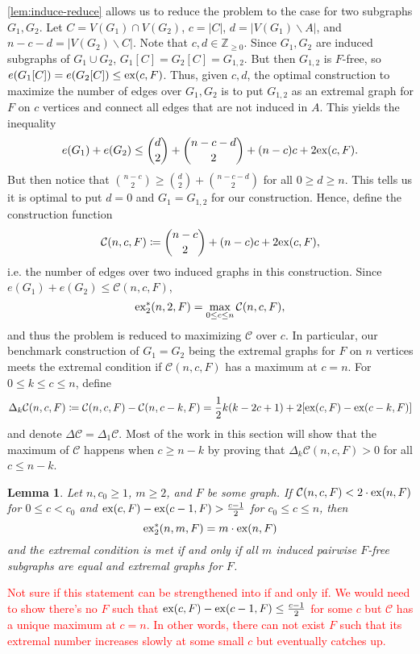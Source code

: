 \documentclass[12pt]{report}
\newtheorem{lemma}[theorem]{Lemma}
\newcommand*{\Z}{\mathbb{Z}}
\newcommand*{\ex}{\textnormal{ex}}
\newcommand*{\dex}{\textnormal{ex}_2}
\newcommand*{\con}{\mathcal{C}}
\begin{document}
\cref{lem:induce-reduce} allows us to reduce the problem to the case for two subgraphs $G_1, G_2$. Let $C = V(G_1) \cap V(G_2)$, $c = |C|$, $d = |V(G_1) \backslash A|$, and $n - c - d = |V(G_2) \backslash C|$. Note that $c, d \in \Z_{\geq 0}$. Since $G_1, G_2$ are induced subgraphs of $G_1 \cup G_2$, $G_1[C] = G_2[C] = G_{1, 2}$. But then $G_{1, 2}$ is $F$-free, so $e(G_1[C]) = e(G_2[C]) \leq \ex(c, F)$. Thus, given $c, d$, the optimal construction to maximize the number of edges over $G_1, G_2$ is to put $G_{1, 2}$ as an extremal graph for $F$ on $c$ vertices and connect all edges that are not induced in $A$. This yields the inequality
\[
  e(G_1) + e(G_2) \leq \binom{d}{2} + \binom{n - c - d}{2} + (n - c)c + 2\ex(c, F).
\]
But then notice that $\binom{n - c}{2} \geq \binom{d}{2} + \binom{n - c - d}{2}$ for all $0 \geq d \geq n$. This tells us it is optimal to put $d = 0$ and $G_1 = G_{1, 2}$ for our construction. Hence, define the construction function
\[
  \con(n, c, F) \coloneq \binom{n - c}{2} + (n - c)c + 2\ex(c, F),
\]
i.e. the number of edges over two induced graphs in this construction. Since $e(G_1) + e(G_2) \leq \con(n, c, F)$, 
\[
  \dex^*(n, 2, F) = \max_{0 \leq c \leq n} \con(n, c, F),
\]
and thus the problem is reduced to maximizing $\con$ over $c$. In particular, our benchmark construction of $G_1 = G_2$ being the extremal graphs for $F$ on $n$ vertices meets the extremal condition if $\con(n, c, F)$ has a maximum at $c = n$. For $0 \leq k \leq c \leq n$, define
\[
  \Delta_k \con(n, c, F) \coloneq \con(n, c, F) - \con(n, c - k, F) = \frac{1}{2}k(k - 2c + 1) + 2[\ex(c, F) - \ex(c - k, F)]
\]
and denote $\Delta \con = \Delta_1 \con$. Most of the work in this section will show that the maximum of $\con$ happens when $c \geq n - k$ by proving that $\Delta_k \con(n, c, F) > 0$ for all $c \leq n - k$.

\begin{lemma}\label{lem:induce-cond}
  Let $n, c_0 \geq 1$, $m \geq 2$, and $F$ be some graph. If $\con(n, c, F)< 2 \cdot \ex(n, F)$ for $0 \leq c < c_0$ and $\ex(c, F) - \ex(c - 1, F) > \frac{c - 1}{2}$ for $c_0 \leq c \leq n$, then
  \[
    \dex^*(n, m, F) = m \cdot \ex(n, F)
  \]
  and the extremal condition is met if and only if all $m$ induced pairwise $F$-free subgraphs are equal and extremal graphs for $F$.
\end{lemma}

\textcolor{red}{Not sure if this statement can be strengthened into if and only if. We would need to show there's no $F$ such that $\ex(c, F) - \ex(c - 1, F) \leq \frac{c - 1}{2}$ for some $c$ but $\con$ has a unique maximum at $c = n$. In other words, there can not exist $F$ such that its extremal number increases slowly at some small $c$ but eventually catches up.}
\end{document}
